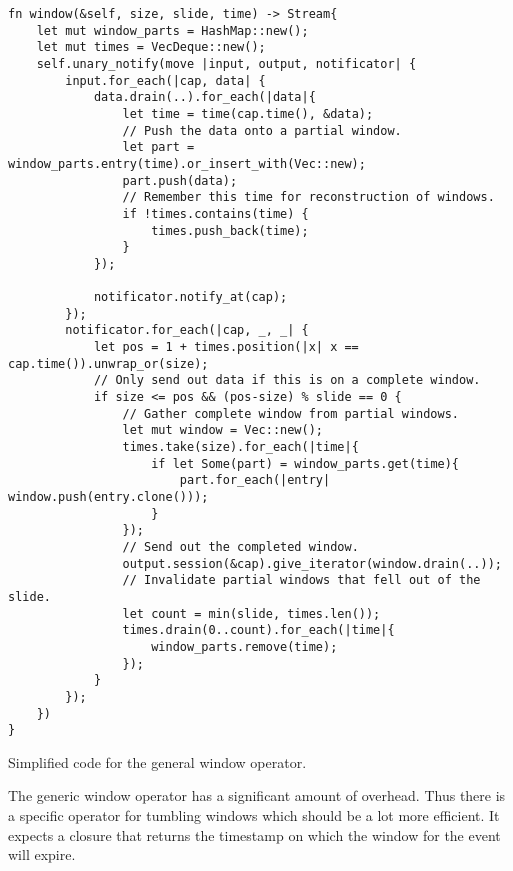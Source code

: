 \begin{listing}[H]
\begin{verbatim}
fn window(&self, size, slide, time) -> Stream{
    let mut window_parts = HashMap::new();
    let mut times = VecDeque::new();
    self.unary_notify(move |input, output, notificator| {
        input.for_each(|cap, data| {
            data.drain(..).for_each(|data|{
                let time = time(cap.time(), &data);
                // Push the data onto a partial window.
                let part = window_parts.entry(time).or_insert_with(Vec::new);
                part.push(data);
                // Remember this time for reconstruction of windows.
                if !times.contains(time) {
                    times.push_back(time);
                }
            });
            
            notificator.notify_at(cap);
        });
        notificator.for_each(|cap, _, _| {
            let pos = 1 + times.position(|x| x == cap.time()).unwrap_or(size);
            // Only send out data if this is on a complete window.
            if size <= pos && (pos-size) % slide == 0 {
                // Gather complete window from partial windows.
                let mut window = Vec::new();
                times.take(size).for_each(|time|{
                    if let Some(part) = window_parts.get(time){
                        part.for_each(|entry| window.push(entry.clone()));
                    }
                });
                // Send out the completed window.
                output.session(&cap).give_iterator(window.drain(..));
                // Invalidate partial windows that fell out of the slide.
                let count = min(slide, times.len());
                times.drain(0..count).for_each(|time|{
                    window_parts.remove(time);
                });
            }
        });
    })
}
\end{verbatim}
  \caption{Simplified code for the general window operator.}
  \label{lst:epoch-window}
\end{listing}

The generic window operator has a significant amount of overhead. Thus there is a specific operator for tumbling windows which should be a lot more efficient. It expects a closure that returns the timestamp on which the window for the event will expire.

